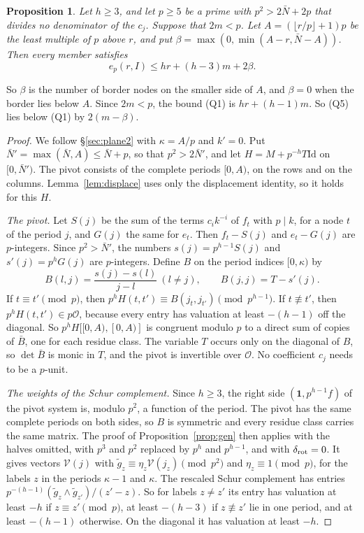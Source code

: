 \documentclass[11pt]{amsart}
\newtheorem{proposition}[theorem]{Proposition}
\theoremstyle{definition}
\theoremstyle{remark}
\numberwithin{equation}{section}
\newcommand{\cO}{\mathcal O}
\newcommand{\Id}{\mathrm{Id}}
\begin{document}
\begin{proposition}\label{prop:rows3e}
Let $h\ge3$, and let $p\ge5$ be a prime with $p^2>2\bar N+2p$ that divides no denominator of the $c_j$. Suppose that
$2m<p$. Let $A=(\lfloor r/p\rfloor+1)p$ be the least multiple of $p$ above $r$, and put
$\beta=\max(0,\min(A-r,\bar N-A))$. Then every member satisfies
\[
 e_p(r,I)\le hr+(h-3)m+2\beta .\tag{Q5}
\]
\end{proposition}

So $\beta$ is the number of border nodes on the smaller side of $A$, and $\beta=0$ when the border lies below $A$. Since
$2m<p$, the bound (Q1) is $hr+(h-1)m$. So (Q5) lies below (Q1) by $2(m-\beta)$.

\begin{proof}
We follow \S\ref{sec:plane2} with $\kappa=A/p$ and $k'=0$. Put $\bar N'=\max(\bar N,A)\le\bar N+p$, so that $p^2>2\bar N'$,
and let $H=M+p^{-h}T\Id$ on $[0,\bar N')$. The pivot consists of the complete periods $[0,A)$, on the rows and on the
columns. Lemma~\ref{lem:displace} uses only the displacement identity, so it holds for this $H$.

\emph{The pivot.} Let $S(j)$ be the sum of the terms $c_ik^{-i}$ of $f_t$ with $p\mid k$, for a node $t$ of the period
$j$, and $G(j)$ the same for $e_t$. Then $f_t-S(j)$ and $e_t-G(j)$ are $p$-integers. Since $p^2>\bar N'$, the numbers
$s(j)=p^{h-1}S(j)$ and $s'(j)=p^hG(j)$ are $p$-integers. Define $B$ on the period indices $[0,\kappa)$ by
\[
 B(l,j)=\frac{s(j)-s(l)}{j-l}\ (l\ne j),\qquad B(j,j)=T-s'(j).
\]
If $t\equiv t'\pmod p$, then $p^hH(t,t')\equiv B(j_t,j_{t'})\pmod{p^{h-1}}$. If $t\not\equiv t'$, then
$p^hH(t,t')\in p\cO$, because every entry has valuation at least $-(h-1)$ off the diagonal. So $p^hH[[0,A),[0,A)]$ is
congruent modulo $p$ to a direct sum of copies of $\bar B$, one for each residue class. The variable $T$ occurs only on
the diagonal of $B$, so $\det\bar B$ is monic in $T$, and the pivot is invertible over $\cO$. No coefficient $c_j$ needs
to be a $p$-unit.

\emph{The weights of the Schur complement.} Since $h\ge3$, the right side $(\mathbf 1,p^{h-1}f)$ of the pivot system is,
modulo $p^2$, a function of the period. The pivot has the same complete periods on both sides, so $B$ is symmetric and
every residue class carries the same matrix. The proof of Proposition~\ref{prop:gen} then applies with the halves
omitted, with $p^3$ and $p^2$ replaced by $p^h$ and $p^{h-1}$, and with $\delta_{\rm rot}=0$. It gives vectors
$\mathcal V(j)$ with $\tilde g_z\equiv\eta_z\mathcal V(j_z)\pmod{p^2}$ and $\eta_z\equiv1\pmod p$, for the labels $z$ in
the periods $\kappa-1$ and $\kappa$. The rescaled Schur complement has entries $p^{-(h-1)}(\tilde g_z\wedge\tilde
g_{z'})/(z'-z)$. So for labels $z\ne z'$ its entry has valuation at least $-h$ if $z\equiv z'\pmod p$, at least $-(h-3)$
if $z\not\equiv z'$ lie in one period, and at least $-(h-1)$ otherwise. On the diagonal it has valuation at least $-h$.


\end{proof}
\end{document}
